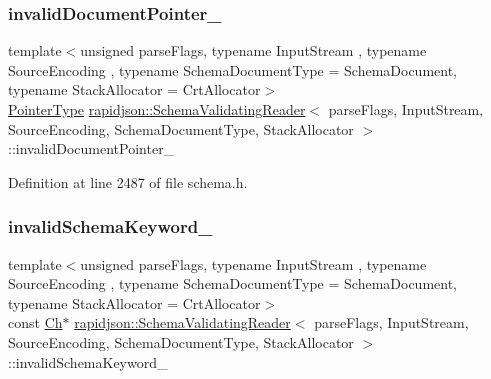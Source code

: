 \subsubsection{\texorpdfstring{invalidDocumentPointer\_}{invalidDocumentPointer\_}}
{\footnotesize\ttfamily template$<$unsigned parse\+Flags, typename Input\+Stream , typename Source\+Encoding , typename Schema\+Document\+Type  = Schema\+Document, typename Stack\+Allocator  = Crt\+Allocator$>$ \\
\mbox{\hyperlink{classrapidjson_1_1_schema_validating_reader_a42c64d1ed25ffb2e70a35b9e43e0e564}{Pointer\+Type}} \mbox{\hyperlink{classrapidjson_1_1_schema_validating_reader}{rapidjson\+::\+Schema\+Validating\+Reader}}$<$ parse\+Flags, Input\+Stream, Source\+Encoding, Schema\+Document\+Type, Stack\+Allocator $>$\+::invalid\+Document\+Pointer\+\_\+\hspace{0.3cm}{\ttfamily [private]}}



Definition at line 2487 of file schema.\+h.

\mbox{\label{classrapidjson_1_1_schema_validating_reader_a409c3e18192a623a92573f8a84596df2}} 
\subsubsection{\texorpdfstring{invalidSchemaKeyword\_}{invalidSchemaKeyword\_}}
{\footnotesize\ttfamily template$<$unsigned parse\+Flags, typename Input\+Stream , typename Source\+Encoding , typename Schema\+Document\+Type  = Schema\+Document, typename Stack\+Allocator  = Crt\+Allocator$>$ \\
const \mbox{\hyperlink{classrapidjson_1_1_schema_validating_reader_a3507a4886ce6778fe1cae39ed5f0baaf}{Ch}}$\ast$ \mbox{\hyperlink{classrapidjson_1_1_schema_validating_reader}{rapidjson\+::\+Schema\+Validating\+Reader}}$<$ parse\+Flags, Input\+Stream, Source\+Encoding, Schema\+Document\+Type, Stack\+Allocator $>$\+::invalid\+Schema\+Keyword\+\_\+\hspace{0.3cm}{\ttfamily [private]}}



